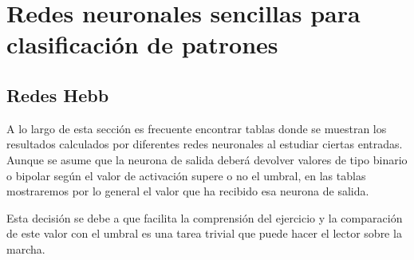 \section{Redes neuronales sencillas para clasificación de patrones}
\subsection{Redes Hebb}
A lo largo de esta sección es frecuente encontrar tablas donde se muestran los resultados calculados por diferentes redes neuronales al estudiar ciertas entradas. Aunque se asume que la neurona de salida deberá devolver valores de tipo binario o bipolar según el valor de activación supere o no el umbral, en las tablas mostraremos por lo general el valor que ha recibido esa neurona de salida.

Esta decisión se debe a que facilita la comprensión del ejercicio y la comparación de este valor con el umbral es una tarea trivial que puede hacer el lector sobre la marcha.

